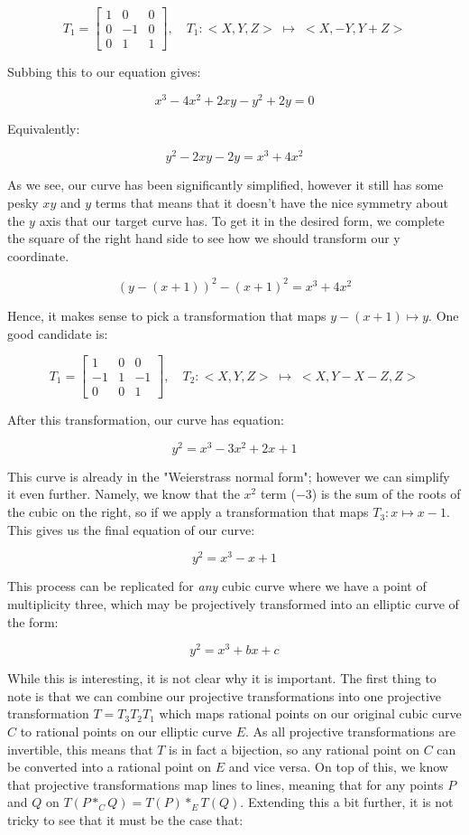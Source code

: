 \documentclass{article}
\begin{document}
\[ T_1 = \begin{bmatrix}
    1 & 0 & 0\\
    0 & -1 & 0\\
    0 & 1 & 1
\end{bmatrix},
\quad
T_1: <X, Y, Z> \; \mapsto \; <X, -Y, Y + Z>
\]

Subbing this to our equation gives:

\[x^{3} - 4 x^{2} + 2 x y - y^{2} + 2 y = 0\]

Equivalently:

\[y^2 - 2 x y - 2y = x^3 + 4x^2\]

As we see, our curve has been significantly simplified, however it still has some pesky $xy$ and $y$ terms that means that it doesn't have the nice symmetry about the $y$ axis that our target curve has. To get it in the desired form, we complete the square of the right hand side to see how we should transform our y coordinate.

\[(y - (x + 1))^2 - (x + 1)^2 = x^3 + 4x^2\]

Hence, it makes sense to pick a transformation that maps $y - (x + 1) \mapsto y$. One good candidate is:

\[ T_1 = \begin{bmatrix}
    1 & 0 & 0\\
    -1 & 1 & -1\\
    0 & 0 & 1
\end{bmatrix},
\quad
T_2: <X, Y, Z> \; \mapsto \; <X, Y - X - Z, Z>
\]

After this transformation, our curve has equation:

\[y^{2} = x^{3} - 3 x^{2} + 2 x  + 1\]

This curve is already in the "Weierstrass normal form"; however we can simplify it even further. Namely, we know that the $x^2$ term ($-3$) is the sum of the roots of the cubic on the right, so if we apply a transformation that maps $T_3: x \mapsto x - 1$. This gives us the final equation of our curve:

\[y^{2} = x^{3} - x  + 1\]

This process can be replicated for \emph{any} cubic curve where we have a point of multiplicity three, which may be projectively transformed into an elliptic curve of the form:

\[y^2 = x^3 + bx + c\]

While this is interesting, it is not clear why it is important. The first thing to note is that we can combine our projective transformations into one  projective transformation $T = T_3 T_2 T_1$ which maps rational points on our original cubic curve $C$ to rational points on our elliptic curve $E$. As all projective transformations are invertible, this means that $T$ is in fact a bijection, so any rational point on $C$ can be converted into a rational point on $E$ and vice versa. On top of this, we know that projective transformations map lines to lines, meaning that for any points $P$ and $Q$ on $T(P *_C Q) = T(P) *_E T(Q)$. Extending this a bit further, it is not tricky to see that it must be the case that:
\end{document}
